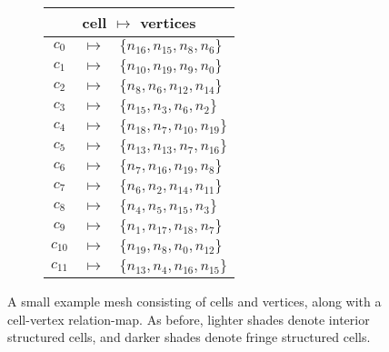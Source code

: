 \begin{figure}

\begin{subfigure}[c]{0.63\textwidth}
\centering

\end{subfigure}
\begin{subfigure}[c]{0.35\textwidth}
\centering
\tabcolsep=0.32mm
\begin{tabular}{ccl}
\multicolumn{3}{c}{cell $\mapsto$ vertices} \\
\hline
$c_{0}$ & $\mapsto$ & $\{n_{16},n_{15},n_{8},n_{6}\}$ \\
$c_{1}$ & $\mapsto$ & $\{n_{10},n_{19},n_{9},n_{0}\}$ \\
$c_{2}$ & $\mapsto$ & $\{n_{8},n_{6},n_{12},n_{14}\}$ \\
$c_{3}$ & $\mapsto$ & $\{n_{15},n_{3},n_{6},n_{2}\}$ \\
$c_{4}$ & $\mapsto$ & $\{n_{18},n_{7},n_{10},n_{19}\}$ \\
$c_{5}$ & $\mapsto$ & $\{n_{13},n_{13},n_{7},n_{16}\}$ \\
$c_{6}$ & $\mapsto$ & $\{n_{7},n_{16},n_{19},n_{8}\}$ \\
$c_{7}$ & $\mapsto$ & $\{n_{6},n_{2},n_{14},n_{11}\}$ \\
$c_{8}$ & $\mapsto$ & $\{n_{4},n_{5},n_{15},n_{3}\}$ \\
$c_{9}$ & $\mapsto$ & $\{n_{1},n_{17},n_{18},n_{7}\}$ \\
$c_{10}$ & $\mapsto$ & $\{n_{19},n_{8},n_{0},n_{12}\}$ \\
$c_{11}$ & $\mapsto$ & $\{n_{13},n_{4},n_{16},n_{15}\}$ \\
\end{tabular}
\end{subfigure}

\caption{A small example mesh consisting of cells and vertices, along with a cell-vertex relation-map. As before, lighter shades denote interior structured cells, and darker shades denote fringe structured cells.}
\label{fig:forward-map}
\end{figure}


